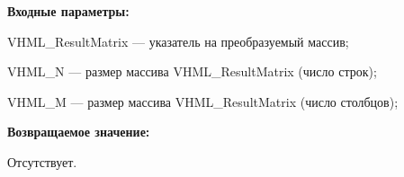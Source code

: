 \textbf{Входные параметры:}

 VHML\_ResultMatrix --- указатель на преобразуемый массив;
 
 VHML\_N --- размер массива VHML\_ResultMatrix (число строк);
 
 VHML\_M --- размер массива VHML\_ResultMatrix (число столбцов);

\textbf{Возвращаемое значение:}

Отсутствует.